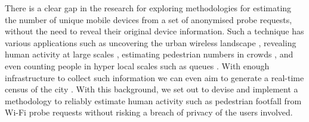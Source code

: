 There is a clear gap in the research for exploring methodologies for estimating
the number of unique mobile devices from a set of anonymised probe requests,
without the need to reveal their original device information. Such a technique
has various applications such as uncovering the urban wireless landscape
\citep{rose2010mapping}, revealing human activity at large scales
\citep{qin2013discovering}, estimating pedestrian numbers in crowds
\citep{schauer2014estimating, fukuzaki2015statistical}, and even counting
people in hyper local scales such as queues \citep{wang2013measuring}. With
enough infrastructure to collect such information we can even aim to generate a
real-time census of the city \citep{konto2017}. With this background, we set
out to devise and implement a methodology to reliably estimate human activity
such as pedestrian footfall from Wi-Fi probe requests without risking a breach
of privacy of the users involved.
